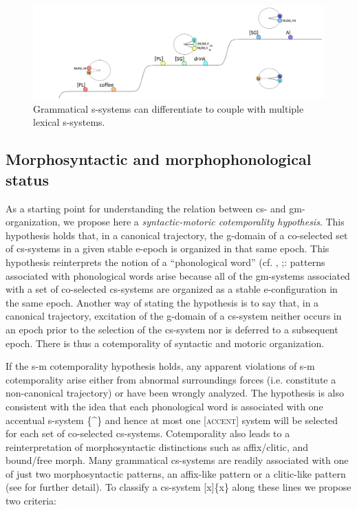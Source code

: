 \begin{enumerate}
  
\begin{figure}
\includegraphics[width=\textwidth]{figures/Tilsen-img67.png}
\caption{Grammatical s-systems can differentiate to couple with multiple lexical s-systems.}
\label{fig:4:17}
\end{figure}
\end{enumerate}
 

\subsection{Morphosyntactic and morphophonological status}

As a starting point for understanding the relation between cs- and gm-organization, we propose here a \textit{syntactic-motoric cotemporality hypothesis}. This hypothesis holds that, in a canonical trajectory, the g-domain of a co-selected set of cs-systems in a given stable e-epoch is organized in that same epoch. This hypothesis reinterprets the notion of a “phonological word” (cf. \citealt{NesporVogel1986}, \citealt{Selkirk1984,Selkirk2011};: patterns associated with phonological words arise because all of the gm-systems associated with a set of co-selected cs-systems are organized as a stable e-configuration in the same epoch. Another way of stating the hypothesis is to say that, in a canonical trajectory, excitation of the g-domain of a cs-system neither occurs in an epoch prior to the selection of the cs-system nor is deferred to a subsequent epoch. There is thus a cotemporality of syntactic and motoric organization. 

  If the s-m cotemporality hypothesis holds, any apparent violations of s-m cotemporality arise either from abnormal surroundings forces (i.e. constitute a non-canonical trajectory) or have been wrongly analyzed. The hypothesis is also consistent with the idea that each phonological word is associated with one accentual s-system \{\^{}\} and hence at most one [\textsc{accent}] system will be selected for each set of co-selected cs-systems. Cotemporality also leads to a reinterpretation of morphosyntactic distinctions such as affix/clitic, and bound/free morph. Many grammatical cs-systems are readily associated with one of just two morphosyntactic patterns, an affix-like pattern or a clitic-like pattern (see \citealt{Payne1997,Zwicky1985,ZwickyPullum1983} for further detail). To classify a cs-system [x]\{x\} along these lines we propose two criteria:\\

